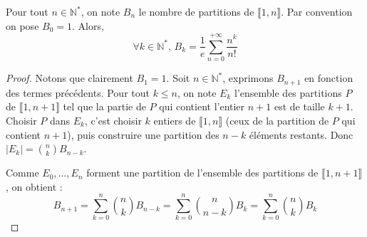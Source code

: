 






	\begin{theorem}
		Pour tout $n \in \mathbb{N}^*$, on note $B_n$ le nombre de partitions de $\llbracket 1, n \rrbracket$. Par convention on pose $B_0 = 1$. Alors,
		\[ \forall k \in \mathbb{N}^*, \, B_k = \frac{1}{e} \sum_{n=0}^{+\infty} \frac{n^k}{n!} \]
	\end{theorem}

	\begin{proof}
		Notons que clairement $B_1 = 1$. Soit $n \in \mathbb{N}^*$, exprimons $B_{n+1}$ en fonction des termes précédents. Pour tout $k \leq n$, on note $E_k$ l'ensemble des partitions $P$ de $\llbracket 1, n+1 \rrbracket$ tel que la partie de $P$ qui contient l'entier $n+1$ est de taille $k+1$. Choisir $P$ dans $E_k$, c'est choisir $k$ entiers de $\llbracket 1, n \rrbracket$ (ceux de la partition de $P$ qui contient $n+1$), puis construire une partition des $n-k$ éléments restants. Donc $|E_k| = \binom{n}{k} B_{n-k}$.

		\medskip
		Comme $E_0, \dots, E_n$ forment une partition de l'ensemble des partitions de $\llbracket 1, n+1 \rrbracket$, on obtient :
		\[ B_{n+1} = \sum_{k=0}^n \binom{n}{k} B_{n-k} = \sum_{k=0}^n \binom{n}{n-k} B_k = \sum_{k=0}^n \binom{n}{k} B_k \tag{$*$} \]


\end{proof}
